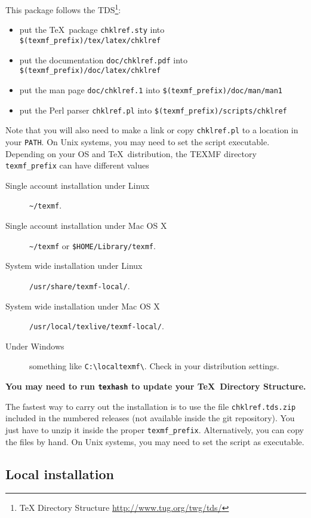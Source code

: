 \documentclass[a4paper,11pt,twoside]{article}
\begin{document}
This package follows the TDS\footnote{TeX Directory Structure
  \url{http://www.tug.org/twg/tds/}}:
\begin{itemize}
  \item  put the \TeX\ package \verb!chklref.sty! into \verb!$(texmf_prefix)/tex/latex/chklref!
  \item  put the documentation \verb!doc/chklref.pdf! into \verb!$(texmf_prefix)/doc/latex/chklref!
  \item  put the man page \verb!doc/chklref.1! into \verb!$(texmf_prefix)/doc/man/man1!
  \item  put the Perl parser \verb!chklref.pl! into \verb!$(texmf_prefix)/scripts/chklref!
\end{itemize}
Note that you will also need to make a link or copy \verb!chklref.pl! to a location in your \texttt{PATH}. On Unix systems, you may need to set the script executable. \\

Depending on your OS and \TeX\ distribution, the TEXMF directory \verb!texmf_prefix! can have different values
\begin{description}
  \item[Single account installation under Linux] \verb!~/texmf!.
  \item[Single account installation under Mac OS X] \verb!~/texmf! or \verb!$HOME/Library/texmf!.
  \item[System wide installation under Linux] \verb!/usr/share/texmf-local/!.
  \item[System wide installation under Mac OS X] \verb!/usr/local/texlive/texmf-local/!.
  \item[Under Windows] something like \verb!C:\localtexmf\!. Check in your distribution settings.
\end{description}

\noindent \textbf{You may need to run \texttt{texhash} to update your \TeX\ Directory Structure.}

The fastest way to carry out the installation is to use the file \verb!chklref.tds.zip! included in the numbered releases (not available inside the git repository). You just have to unzip it inside the proper \verb!texmf_prefix!. Alternatively, you can copy the files by hand. On Unix systems, you may need to set the script as executable.

\subsection{Local installation}
\end{document}
